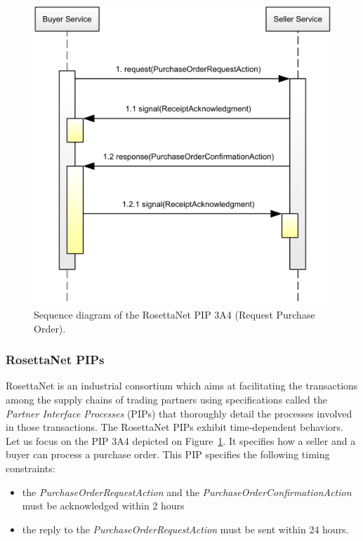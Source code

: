 \begin{figure}[htbp]
    \centering
    \includegraphics[width=\textwidth]{content/protocol-model/pip3a4}
    \caption{Sequence diagram of the RosettaNet PIP 3A4 (Request Purchase Order).}
    \label{fig:pip3a4}
\end{figure}

\subsubsection{RosettaNet PIPs}

RosettaNet \cite{ROSETTANET} is an industrial consortium which aims at facilitating the transactions among the supply chains of trading partners using specifications called the \emph{Partner Interface Processes} (PIPs) that thoroughly detail the processes involved in those transactions. The RosettaNet PIPs exhibit time-dependent behaviors. Let us focus on the PIP 3A4 depicted on Figure~\ref{fig:pip3a4}. It specifies how a seller and a buyer can process a purchase order. This PIP specifies the following timing constraints:
\begin{itemize}

    \item the \emph{PurchaseOrderRequestAction} and the \emph{PurchaseOrderConfirmationAction} must be acknowledged within 2 hours

    \item the reply to the \emph{PurchaseOrderRequestAction} must be sent within 24 hours.

\end{itemize}

